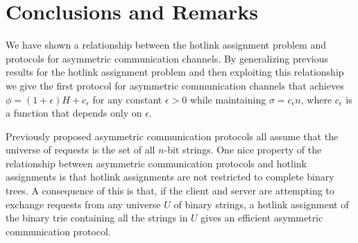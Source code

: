 \documentclass[lotsofwhite]{patmorin}
\newcommand{\sbits}{\sigma}
\newcommand{\cbits}{\phi}
\begin{document}
\section{Conclusions and Remarks}

We have shown a relationship between the hotlink assignment problem
and protocols for asymmetric communication channels.  By generalizing
previous results for the hotlink assignment problem and then
exploiting this relationship we give the first protocol for asymmetric
communication channels that achieves $\cbits=(1+\epsilon)H+c_\epsilon$
for any constant $\epsilon>0$ while maintaining $\sbits=c_\epsilon n$,
where $c_\epsilon$ is a function that depends only on $\epsilon$.

Previously proposed asymmetric communication protocols all assume that
the universe of requests is the set of all $n$-bit strings.  One nice
property of the relationship between asymmetric communication
protocols and hotlink assignments is that hotlink assignments are not
restricted to complete binary trees.  A consequence of this is that,
if the client and server are attempting to exchange requests from any
universe $U$ of binary strings, a hotlink assignment of the binary
trie containing all the strings in $U$ gives an efficient asymmetric
communication protocol. 

 

\end{document}
